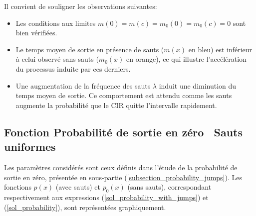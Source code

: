 Il convient de souligner les observations suivantes:
\begin{itemize}
    \item Les conditions aux limites \( m(0) = m(c) = m_0(0) = m_0(c) = 0 \) sont bien vérifiées.
    \item Le temps moyen de sortie en présence de sauts ($m(x)$ en bleu) est inférieur à celui observé sans sauts ($m_0(x)$ en orange), ce qui illustre l'accélération du processus induite par ces derniers.
    \item Une augmentation de la fréquence des sauts $\lambda$ induit une diminution du temps moyen de sortie. Ce comportement est attendu comme les sauts augmente la probabilité que le \acs{CIR} quitte l'intervalle rapidement.
\end{itemize}

\subsection{Fonction Probabilité de sortie en zéro \textemdash~Sauts uniformes}
Les paramètres considérés sont ceux définis dans l'étude de la probabilité de sortie en zéro, présentée en sous-partie (\ref{subsection_probability_jumps}). Les fonctions \( p(x) \) (avec sauts) et \( p_0(x) \) (sans sauts), correspondant respectivement aux expressions (\ref{sol_probability_with_jumps}) et (\ref{sol_probability}), sont représentées graphiquement.
